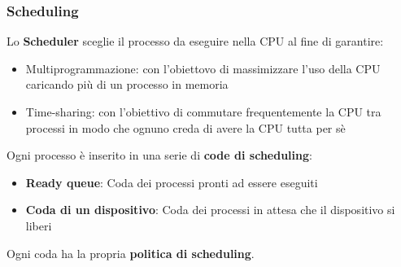 \documentclass[a4paper]{article}
\begin{document}
\subsubsection{Scheduling}
Lo \textbf{Scheduler} sceglie il processo da eseguire nella CPU al fine di
garantire:
\begin{itemize}
  \item Multiprogrammazione: con l'obiettovo di massimizzare l'uso della CPU
    caricando più di un processo in memoria
  \item Time-sharing: con l'obiettivo di commutare frequentemente la CPU tra
    processi in modo che ognuno creda di avere la CPU tutta per sè
\end{itemize}
Ogni processo è inserito in una serie di \textbf{code di scheduling}:
\begin{itemize}
  \item \textbf{Ready queue}: Coda dei processi pronti ad essere eseguiti
  \item \textbf{Coda di un dispositivo}: Coda dei processi in attesa che il dispositivo
    si liberi
\end{itemize}
Ogni coda ha la propria \textbf{politica di scheduling}.
\end{document}
